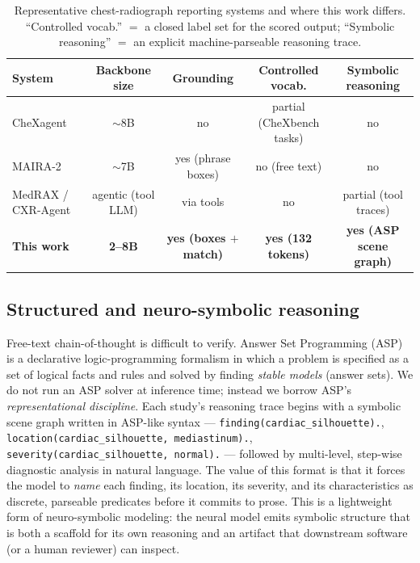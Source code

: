 \documentclass[11pt,a4paper]{article}
\begin{document}
\begin{table}[H]
\centering\footnotesize
\caption{Representative chest-radiograph reporting systems and where this work differs. ``Controlled vocab.'' $=$ a closed label set for the scored output; ``Symbolic reasoning'' $=$ an explicit machine-parseable reasoning trace.}
\label{tab:related}
\begin{tabularx}{\textwidth}{L c c c c}
\toprule
\textbf{System} & \textbf{Backbone size} & \textbf{Grounding} & \textbf{Controlled vocab.} & \textbf{Symbolic reasoning} \\
\midrule
CheXagent & $\sim$8B & no & partial (CheXbench tasks) & no \\
MAIRA-2 & $\sim$7B & yes (phrase boxes) & no (free text) & no \\
MedRAX / CXR-Agent & agentic (tool LLM) & via tools & no & partial (tool traces) \\
\textbf{This work} & \textbf{2--8B} & \textbf{yes (boxes $+$ match)} & \textbf{yes (132 tokens)} & \textbf{yes (ASP scene graph)} \\
\bottomrule
\end{tabularx}
\end{table}

\subsection{Structured and neuro-symbolic reasoning}
Free-text chain-of-thought is difficult to verify. Answer Set Programming (ASP) is a declarative logic-programming formalism in which a problem is specified as a set of logical facts and rules and solved by finding \emph{stable models} (answer sets). We do not run an ASP solver at inference time; instead we borrow ASP's \emph{representational discipline}. Each study's reasoning trace begins with a symbolic scene graph written in ASP-like syntax --- \texttt{finding(cardiac\_silhouette).}, \texttt{location(cardiac\_silhouette, mediastinum).}, \texttt{severity(cardiac\_silhouette, normal).} --- followed by multi-level, step-wise diagnostic analysis in natural language. The value of this format is that it forces the model to \emph{name} each finding, its location, its severity, and its characteristics as discrete, parseable predicates before it commits to prose. This is a lightweight form of neuro-symbolic modeling: the neural model emits symbolic structure that is both a scaffold for its own reasoning and an artifact that downstream software (or a human reviewer) can inspect.
\end{document}
